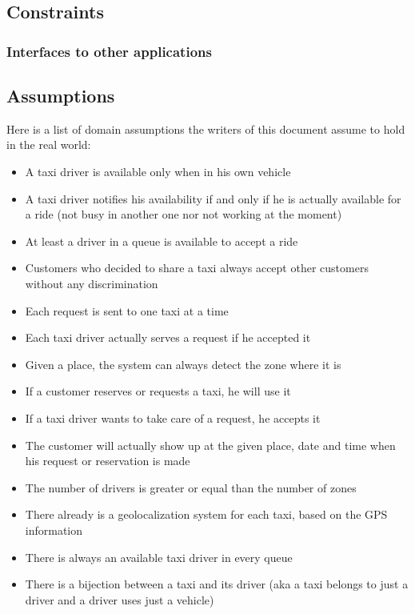 \pagebreak
\subsection{Constraints}

\subsubsection{Interfaces to other applications}

\subsection{Assumptions}
Here is a list of domain assumptions the writers of this document assume to hold in the real world:
\begin{itemize}
    \item A taxi driver is available only when in his own vehicle 
    \item A taxi driver notifies his availability if and only if he is actually available for a ride (not busy in another one nor not working at the moment)
    \item At least a driver in a queue is available to accept a ride
    \item Customers who decided to share a taxi always accept other customers without any discrimination
    \item Each request is sent to one taxi at a time
    \item Each taxi driver actually serves a request if he accepted it
    \item Given a place, the system can always detect the zone where it is
    \item If a customer reserves or requests a taxi, he will use it
    \item If a taxi driver wants to take care of a request, he accepts it
    \item The customer will actually show up at the given place, date and time when his request or reservation is made
    \item The number of drivers is greater or equal than the number of zones
    \item There already is a geolocalization system for each taxi, based on the GPS information
    \item There is always an available taxi driver in every queue
    \item There is a bijection between a taxi and its driver (aka a taxi belongs to just a driver and a driver uses just a vehicle)
\end{itemize}
